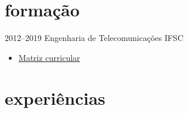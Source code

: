 \documentclass[]{friggeri-cv} %
\begin{document}

\section{formação}

\begin{entrylist}
\entry
{2012--2019}
{Engenharia de Telecomunicações}
{IFSC}
{
    \begin{itemize}
        \item \href{http://bit.ly/2VAPEeh}{Matriz curricular}
    \end{itemize}
}
\end{entrylist}


\section{experiências}
\end{document}
